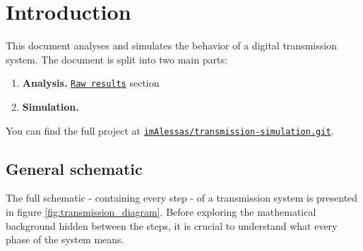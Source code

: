 \setcounter{secnumdepth}{0}
\section{Introduction}
This document analyses and simulates the behavior of a digital transmission system. The document is split into two main parts:

\begin{enumerate}[label=\roman*]
    \item \textbf{Analysis.} \hyperref[raw-results]{\texttt{Raw results}} section
    \item \textbf{Simulation.}
\end{enumerate}



You can find the full project at \texttt{\href{https://github.com/imAlessas/transmission-simulation.git}{imAlessas/transmission-simulation.git}}.

\subsection{General schematic}
The full schematic - containing every step - of a transmission system is presented in figure \ref{fig:transmission_diagram}. Before exploring the mathematical background hidden between the steps, it is crucial to understand what every phase of the system means.

